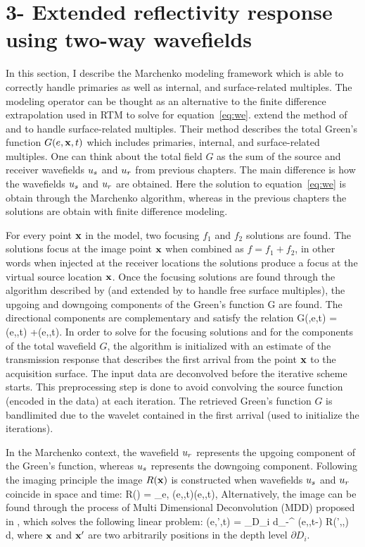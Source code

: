 \newpage
\section{3- Extended reflectivity response using two-way wavefields}




In this section, I describe the Marchenko modeling framework which is able to correctly
handle primaries as well as  internal, and surface-related multiples. The modeling operator
can be thought as an alternative to the finite difference extrapolation used in RTM to solve for 
equation~\ref{eq:we}.
 \cite{Singh2015} extend the method of \cite{Wapenaar} and \cite{Fil2012} to handle surface-related
multiples. Their method
describes the total Green's function $G(e,{\bf x},t)$ which includes
primaries, internal, and surface-related multiples. One can think about the total
field $G$ as the sum of the source and receiver wavefields $u_s$ and $u_r$ from previous chapters. 
 The main difference is how the wavefields $u_s$ and $u_r$ are obtained. Here the 
solution to equation~\ref{eq:we} is obtain through the Marchenko algorithm, whereas 
in the previous chapters the solutions are obtain with finite difference modeling.  


For every point ${\bf x}$ in the model, two focusing $f_1$ and $f_2$ solutions are found. 
 The solutions focus at the image point ${\bf x}$ when combined as $f = f_1+f_2$, in other words 
when injected at the receiver locations the solutions produce a focus at the virtual source
location ${\bf x}$. 
Once the focusing solutions are found through the algorithm described by \cite{wapenaar2014green} (and 
extended by \cite{Singh2015} to handle free surface multiples), the upgoing and downgoing 
components of the Green's function G are found. The directional components are complementary and satisfy 
the relation
\beq
 G(\xx,e,t) = \US(e,\xx,t) +\UR(e,\xx,t).
\eeq
 In order to solve for the focusing solutions and for the components of the total wavefield $G$, the algorithm
is initialized with an estimate of the transmission response that describes the first arrival from the point 
${\bf x}$ to the acquisition surface. The input data are deconvolved before the iterative scheme starts. This 
preprocessing step is done to avoid convolving the source function (encoded in the data) at each iteration. The retrieved
Green's function $G$ is bandlimited due to the wavelet contained in the first arrival (used to initialize the
iterations).  

In the Marchenko context, the wavefield $u_r$ represents the upgoing component of the Green's function, 
whereas $u_s$ represents the downgoing component. 
 Following the imaging principle \citep{unified} the image $R({\bf x})$ is constructed 
when wavefields $u_s$ and $u_r$ coincide in space and time:
\beq
  R(\xx) = \sum_{e,\omega}  \US(e,\xx,t){\UR}(e,\xx,t),
\eeq
 Alternatively, the 
image can be found through the process of Multi Dimensional Deconvolution (MDD) proposed in \cite{Joost},
which solves the following linear problem:
\beq
  \UR(e,\xx',t) = \int_{\partial D_i} d\xx \int_{-\infty}^{\infty}  \US(e,\xx,t-\tau) R(\xx',\xx,\tau) d\tau,
  \label{eq:multi} 
\eeq
where ${\bf x}$ and ${\bf x}'$ are two arbitrarily positions in the depth level $\partial D_i$.  


